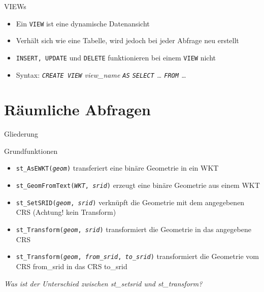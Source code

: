 \documentclass[18pt]{beamer}
\newcommand{\sql}[1]{%
\texttt{\color{sql}#1}
}
\begin{document}
\begin{frame}{VIEWs}
\begin{itemize}
\item Ein \sql{VIEW} ist eine dynamische Datenansicht
\item Verhält sich wie eine Tabelle, wird jedoch bei jeder Abfrage neu erstellt
\item \sql{INSERT, UPDATE} und \sql{DELETE} funktionieren bei einem \sql{VIEW} nicht
\bigskip\par
\item Syntax: \textit{\sql{CREATE VIEW} view\_name \sql{AS} \sql{SELECT} \ldots \sql{FROM} \ldots }
\end{itemize}
\end{frame}



\section{Räumliche Abfragen}

\begin{frame}{Gliederung}
\tableofcontents[currentsection]
\end{frame}

\begin{frame}{Grundfunktionen}
\begin{itemize}
\item \texttt{st\_AsEWKT(\textit{geom})} transferiert eine binäre Geometrie in ein WKT
\item \texttt{st\_GeomFromText(\textit{WKT}, \textit{srid})} erzeugt eine binäre Geometrie aus einem WKT
\item \texttt{st\_SetSRID(\textit{geom}, \textit{srid})} verknüpft die Geometrie mit dem angegebenen CRS (Achtung! kein Transform)
\item \texttt{st\_Transform(\textit{geom}, \textit{srid})} transformiert die Geometrie in das angegebene CRS
\item \texttt{st\_Transform(\textit{geom}, \textit{from\_srid}, \textit{to\_srid})} transformiert die Geometrie vom CRS from\_srid in das CRS to\_srid
\end{itemize}\medskip\par
\textit{Was ist der Unterschied zwischen st\_setsrid und st\_transform?}
\end{frame}
\end{document}
